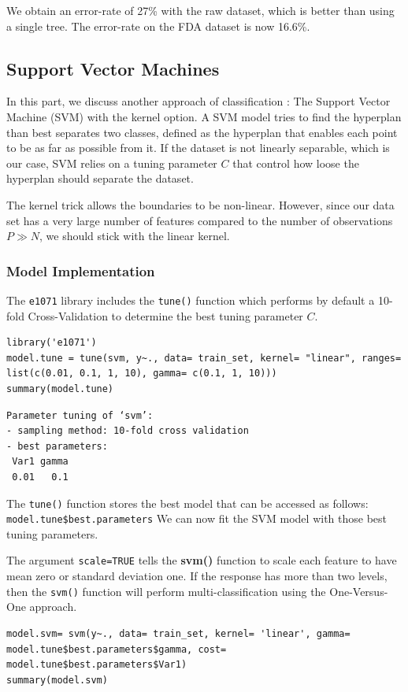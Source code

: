 \documentclass[]{report}
\begin{document}
We obtain an error-rate of 27\% with the raw dataset, which is better than using a single tree. The error-rate on the FDA dataset is now 16.6\%.
 
\pagebreak
\subsection{Support Vector Machines}
In this part, we discuss another approach of classification : The Support Vector Machine (SVM) with the kernel option. A SVM model tries to find the hyperplan than best separates two classes, defined as the hyperplan that enables each point to be as far as possible from it. If the dataset is not linearly separable, which is our case, SVM relies on a tuning parameter $C$ that control how loose the hyperplan should separate the dataset.

The kernel trick allows the boundaries to be non-linear. However, since our data set has a very large number of features compared to the number of observations $P \gg N$, we should stick with the linear kernel. 

\subsubsection{Model Implementation}
The \texttt{e1071} library includes the \texttt{tune()} function which performs by default a 10-fold Cross-Validation to determine the best tuning parameter $C$.
\begin{lstlisting}
library('e1071')
model.tune = tune(svm, y~., data= train_set, kernel= "linear", ranges= list(c(0.01, 0.1, 1, 10), gamma= c(0.1, 1, 10)))
summary(model.tune)
\end{lstlisting}

\begin{verbatim}
Parameter tuning of ‘svm’:
- sampling method: 10-fold cross validation 
- best parameters:
 Var1 gamma
 0.01   0.1
\end{verbatim}

The \texttt{tune()} function stores the best model that can be accessed as follows: \texttt{model.tune\$best.parameters} We can now fit the SVM model with those best tuning parameters.

The argument \texttt{scale=TRUE} tells the \textbf{svm()} function to scale each feature to have mean zero or standard deviation one. If the response has more than two levels, then the \texttt{svm()} function will perform multi-classification using the One-Versus-One approach.
\begin{lstlisting}
model.svm= svm(y~., data= train_set, kernel= 'linear', gamma= model.tune$best.parameters$gamma, cost= model.tune$best.parameters$Var1)
summary(model.svm)
\end{lstlisting}
\end{document}
